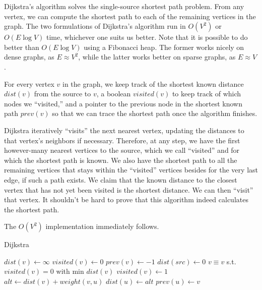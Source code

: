 \documentclass[11pt]{book}
\begin{document}
Dijkstra's algorithm solves the single-source shortest path problem. From any vertex, we can compute the shortest path to each of the remaining vertices in the graph. The two formulations of Dijkstra's algorithm run in $O(V^2)$ or $O(E\log{V})$ time, whichever one suits us better. Note that it is possible to do better than $O(E\log{V})$ using a Fibonacci heap. The former works nicely on dense graphs, as $E \approx V^2$, while the latter works better on sparse graphs, as $E \approx V$.

For every vertex $v$ in the graph, we keep track of the shortest known distance $dist(v)$ from the source to $v$, a boolean $visited(v)$ to keep track of which nodes we ``visited,'' and a pointer to the previous node in the shortest known path $prev(v)$ so that we can trace the shortest path once the algorithm finishes.

Dijkstra iteratively ``visits'' the next nearest vertex, updating the distances to that vertex's neighbors if necessary. Therefore, at any step, we have the first however-many nearest vertices to the source, which we call ``visited'' and for which the shortest path is known. We also have the shortest path to all the remaining vertices that stays within the ``visited'' vertices besides for the very last edge, if such a path exists. We claim that the known distance to the closest vertex that has not yet been visited is the shortest distance. We can then ``visit'' that vertex. It shouldn't be hard to prove that this algorithm indeed calculates the shortest path.

The $O(V^2)$ implementation immediately follows.

\begin{algorithm}[H]
\caption{Dijkstra}
\begin{algorithmic}
	\State $dist(v) \gets \infty$
	\State $visited(v) \gets 0$
    \State $prev(v) \gets -1$
\EndFor
\State $dist(src) \gets 0$
	\State $v \equiv v$ s.t. $visited(v)=0$ with min $dist(v)$
    \State $visited(v) \gets 1$
    		\State $alt \gets dist(v) + weight(v, u)$
				\State $dist(u) \gets alt$
   	        	\State $prev(u) \gets v$
			\EndIf
        \EndIf
    \EndFor
\EndWhile
\end{algorithmic}
\end{algorithm}

\begin{center}
\end{center}
\end{document}
